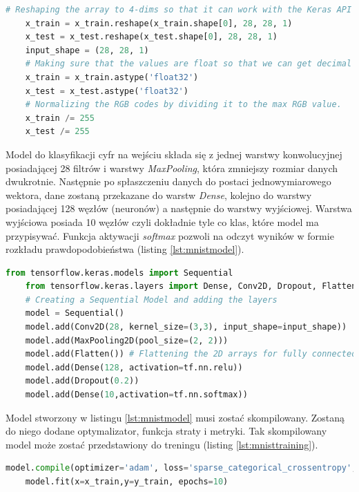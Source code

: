 \documentclass[a4paper,12pt,oneside]{book} %
\begin{document}
\begin{lstlisting}[language=Python, caption={Zmiana rozmiarów tablic i normalizacja\cite{mnistapp}}, label={lst:mnistreshape}]
	# Reshaping the array to 4-dims so that it can work with the Keras API
	x_train = x_train.reshape(x_train.shape[0], 28, 28, 1)
	x_test = x_test.reshape(x_test.shape[0], 28, 28, 1)
	input_shape = (28, 28, 1)
	# Making sure that the values are float so that we can get decimal points after division
	x_train = x_train.astype('float32')
	x_test = x_test.astype('float32')
	# Normalizing the RGB codes by dividing it to the max RGB value.
	x_train /= 255
	x_test /= 255
\end{lstlisting}

Model do klasyfikacji cyfr na wejściu składa się z jednej warstwy konwolucyjnej posiadającej 28 filtrów i warstwy \emph{MaxPooling}, która zmniejszy rozmiar danych dwukrotnie. Następnie po spłaszczeniu danych do postaci jednowymiarowego wektora, dane zostaną przekazane do warstw \emph{Dense}, kolejno do warstwy posiadającej 128 węzłów (neuronów) a następnie do warstwy wyjściowej. Warstwa wyjściowa posiada 10 węzłów czyli dokładnie tyle co klas, które model ma przypisywać. Funkcja aktywacji \emph{softmax} pozwoli na odczyt wyników w formie rozkładu prawdopodobieństwa (listing \ref{lst:mnistmodel})\cite{mnistapp}.

\begin{lstlisting}[language=Python, caption={Budowa modelu\cite{mnistapp}}, label={lst:mnistmodel}]
	from tensorflow.keras.models import Sequential
	from tensorflow.keras.layers import Dense, Conv2D, Dropout, Flatten, MaxPooling2D
	# Creating a Sequential Model and adding the layers
	model = Sequential()
	model.add(Conv2D(28, kernel_size=(3,3), input_shape=input_shape))
	model.add(MaxPooling2D(pool_size=(2, 2)))
	model.add(Flatten()) # Flattening the 2D arrays for fully connected layers
	model.add(Dense(128, activation=tf.nn.relu))
	model.add(Dropout(0.2))
	model.add(Dense(10,activation=tf.nn.softmax))
\end{lstlisting}

Model stworzony w listingu \ref{lst:mnistmodel} musi zostać skompilowany. Zostaną do niego dodane optymalizator, funkcja straty i metryki. Tak skompilowany model może zostać przedstawiony do treningu (listing \ref{lst:mnisttraining})\cite{mnistapp}. 

\begin{lstlisting}[language=Python, caption={Kompilacja i trening modelu\cite{mnistapp}}, label={lst:mnisttraining}]
	model.compile(optimizer='adam', loss='sparse_categorical_crossentropy', metrics=['accuracy'])
	model.fit(x=x_train,y=y_train, epochs=10)
\end{lstlisting}
\end{document}
